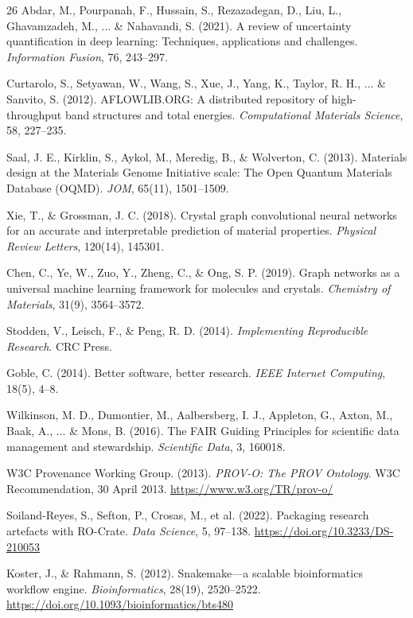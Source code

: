 \documentclass[11pt,a4paper,oneside]{report}
\begin{document}
\begin{thebibliography}{26}
Abdar, M., Pourpanah, F., Hussain, S., Rezazadegan, D., Liu, L., Ghavamzadeh, M., ... \& Nahavandi, S. (2021). A review of uncertainty quantification in deep learning: Techniques, applications and challenges. \emph{Information Fusion}, 76, 243--297.

Curtarolo, S., Setyawan, W., Wang, S., Xue, J., Yang, K., Taylor, R. H., ... \& Sanvito, S. (2012). AFLOWLIB.ORG: A distributed repository of high-throughput band structures and total energies. \emph{Computational Materials Science}, 58, 227--235.

Saal, J. E., Kirklin, S., Aykol, M., Meredig, B., \& Wolverton, C. (2013). Materials design at the Materials Genome Initiative scale: The Open Quantum Materials Database (OQMD). \emph{JOM}, 65(11), 1501--1509.

Xie, T., \& Grossman, J. C. (2018). Crystal graph convolutional neural networks for an accurate and interpretable prediction of material properties. \emph{Physical Review Letters}, 120(14), 145301.

Chen, C., Ye, W., Zuo, Y., Zheng, C., \& Ong, S. P. (2019). Graph networks as a universal machine learning framework for molecules and crystals. \emph{Chemistry of Materials}, 31(9), 3564--3572.

Stodden, V., Leisch, F., \& Peng, R. D. (2014). \emph{Implementing Reproducible Research}. CRC Press.

Goble, C. (2014). Better software, better research. \emph{IEEE Internet Computing}, 18(5), 4--8.

Wilkinson, M. D., Dumontier, M., Aalbersberg, I. J., Appleton, G., Axton, M., Baak, A., ... \& Mons, B. (2016). The FAIR Guiding Principles for scientific data management and stewardship. \emph{Scientific Data}, 3, 160018.

W3C Provenance Working Group. (2013). \emph{PROV-O: The PROV Ontology}. W3C Recommendation, 30 April 2013. \url{https://www.w3.org/TR/prov-o/}

Soiland-Reyes, S., Sefton, P., Crosas, M., et al. (2022). Packaging research artefacts with RO-Crate. \emph{Data Science}, 5, 97--138. \url{https://doi.org/10.3233/DS-210053}

Koster, J., \& Rahmann, S. (2012). Snakemake---a scalable bioinformatics workflow engine. \emph{Bioinformatics}, 28(19), 2520--2522. \url{https://doi.org/10.1093/bioinformatics/bts480}


\end{thebibliography}
\end{document}
